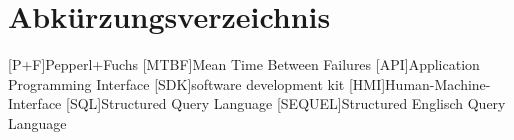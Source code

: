 
\chapter*{Abkürzungsverzeichnis}
\begin{acronym}[slmtA]
    [P+F]{Pepperl+Fuchs}
    [MTBF]{Mean Time Between Failures}
    [API]{Application Programming Interface}
    [SDK]{software development kit}
    [HMI]{Human-Machine-Interface }
    [SQL]{Structured Query Language}
    [SEQUEL]{Structured Englisch Query Language}
\end{acronym}
